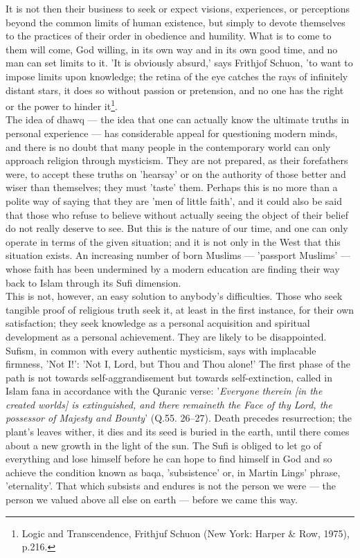 \documentclass[11pt, b5paper, twoside]{book}
\begin{document}
It is not then their business to seek or expect visions, experiences, or perceptions beyond the 
common limits of human existence, but simply to devote themselves to the practices of their order in 
obedience and humility. What is to come to them will come, God willing, in its own way and in its own 
good time, and no man can set limits to it. 'It is obviously absurd,' says Frithjof Schuon, 'to want 
to impose limits upon knowledge; the retina of the eye catches the rays of infinitely distant stars, 
it does so without passion or pretension, and no one has the right or the power to hinder it\footnote{Logic and Transcendence, Frithjuf Schuon (New York: Harper \& Row, 1975), p.216.}. \\

The idea of dhawq --- the idea that one can actually know the ultimate truths in personal experience --- 
has considerable appeal for questioning modern minds, and there is no doubt that many people in the 
contemporary world can only approach religion through mysticism. They are not prepared, as their 
forefathers were, to accept these truths on 'hearsay' or on the authority of those better and wiser 
than themselves; they must 'taste' them. Perhaps this is no more than a polite way of saying that 
they are 'men of little faith', and it could also be said that those who refuse to believe without 
actually seeing the object of their belief do not really deserve to see. But this is the nature of 
our time, and one can only operate in terms of the given situation; and it is not only in the West 
that this situation exists. An increasing number of born Muslims --- 'passport Muslims' --- whose faith 
has been undermined by a modern education are finding their way back to Islam through its Sufi 
dimension. \\

This is not, however, an easy solution to anybody's difficulties. Those who seek tangible proof of 
religious truth seek it, at least in the first instance, for their own satisfaction; they seek 
knowledge as a personal acquisition and spiritual development as a personal achievement. They are 
likely to be disappointed. Sufism, in common with every authentic mysticism, says with implacable 
firmness, 'Not I!': 'Not I, Lord, but Thou and Thou alone!' The first phase of the path is not 
towards self-aggrandisement but towards self-extinction, called in Islam fana in accordance with the 
Quranic verse: '\emph{Everyone therein [in the created worlds] is extinguished, and there remaineth the 
Face of thy Lord, the possessor of Majesty and Bounty}' (Q.55. 26--27). Death precedes resurrection; the 
plant's leaves wither, it dies and its seed is buried in the earth, until there comes about a new 
growth in the light of the sun. The Sufi is obliged to let go of everything and lose himself before 
he can hope to find himself in God and so achieve the condition known as baqa, 'subsistence' or, in 
Martin Lings' phrase, 'eternality'. That which subsists and endures is not the person we were --- the 
person we valued above all else on earth --- before we came this way. \\
\end{document}
